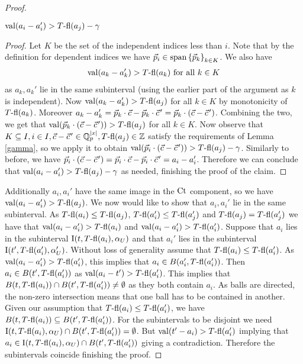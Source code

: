 \documentclass{amsart}
\begin{document}
\begin{proof}
  \begin{Claim}
    $\operatorname{val}(a_i - a_i') > T{\operatorname{-fl}}(a_j) - \gamma$
  \end{Claim}
  \begin{proof}
    Let $K$ be the set of the independent indices less than $i$.
    Note that by the definition for dependent indices we have $\vec p_i \in \operatorname{span} \left\{\vec p_k\right\}_{k \in K}$.
    We also have 
    \begin{align*}
      \operatorname{val}(a_k - a_k') > T{\operatorname{-fl}}(a_k) \text { for all } k \in K
    \end{align*}
    as $a_k, a_k'$ lie in the same subinterval (using the earlier part of the argument as $k$ is independent).
    Now $\operatorname{val}(a_k - a_k') > T{\operatorname{-fl}}(a_j)$  for all $k \in K$ by monotonicity of $T{\operatorname{-fl}}(a_k)$.
    Moreover $a_k - a_k' = \vec p_k \cdot \vec c - \vec p_k \cdot \pvec c' = \vec p_k \cdot (\vec c - \pvec {c}')$.
    Combining the two, we get that $\val(\vec p_k \cdot (\vec c - \pvec {c}')) > \tfl(a_j)$ for all $k \in K$.
    Now observe that $K \subseteq I, i \in I, \vec c - \pvec {c}' \in \Q_p^{|x|}, \tfl(a_j) \in \Z$
    satisfy the requirements of Lemma \ref {gamma}, so we apply it to obtain
    $\val(\vec p_i \cdot (\vec c - \pvec {c}')) > \tfl(a_j) - \gamma$.
    Similarly to before, we have $\vec p_i \cdot (\vec c - \pvec {c}') = \vec p_i \cdot \vec c - \vec p_i \cdot \pvec {c}' = a_i - a_i'$.
    Therefore we can conclude that $\operatorname{val}(a_i - a_i') > T{\operatorname{-fl}}(a_j) - \gamma$
    as needed, finishing the proof of the claim.
  \end{proof}	
  Additionally $a_i, a_i'$ have the same image in the $\operatorname{Ct}$ component, so we have $\operatorname{val}(a_i - a_i') > T{\operatorname{-fl}}(a_j)$.
  We now would like to show that $a_i, a_i'$ lie in the same subinterval.
  As $T{\operatorname{-fl}}(a_i) \leq T{\operatorname{-fl}}(a_j)$, $T{\operatorname{-fl}}(a_i') \leq T{\operatorname{-fl}}(a_j')$ and $T{\operatorname{-fl}}(a_j) = T{\operatorname{-fl}}(a_j')$ we have that
  $\operatorname{val}(a_i - a_i') > T{\operatorname{-fl}}(a_i)$ and $\operatorname{val}(a_i - a_i') > T{\operatorname{-fl}}(a_i')$.
  Suppose that $a_i$ lies in the subinterval $\operatorname{I}(t, T{\operatorname{-fl}}(a_i), \alpha_U)$
  and that $a_i'$ lies in the subinterval $\operatorname{I}(t', T{\operatorname{-fl}}(a_i'), \alpha_U')$.
  Without loss of generality assume that $T{\operatorname{-fl}}(a_i) \leq T{\operatorname{-fl}}(a_i')$.
  As $\operatorname{val}(a_i - a_i') > T{\operatorname{-fl}}(a_i')$, this implies that $a_i \in B(a_i', T{\operatorname{-fl}}(a_i'))$.
  Then $a_i \in B(t', T{\operatorname{-fl}}(a_i'))$ as $\operatorname{val}(a_i - t') > T{\operatorname{-fl}}(a_i')$.
  This implies that $B(t, T{\operatorname{-fl}}(a_i)) \cap B(t', T{\operatorname{-fl}}(a_i')) \neq \emptyset$ as they both contain $a_i$.
  As balls are directed, the non-zero intersection means that one ball has to be contained in another.
  Given our assumption that $T{\operatorname{-fl}}(a_i) \leq T{\operatorname{-fl}}(a_i')$, we have $B(t, T{\operatorname{-fl}}(a_i)) \subseteq B(t', T{\operatorname{-fl}}(a_i'))$.
  For the subintervals to be disjoint we need 
  $\operatorname{I}(t, T{\operatorname{-fl}}(a_i), \alpha_U) \cap B(t', T{\operatorname{-fl}}(a_i')) = \emptyset$.
  But $\operatorname{val}(t' - a_i) > T{\operatorname{-fl}}(a_i')$ implying that $a_i \in \operatorname{I}(t, T{\operatorname{-fl}}(a_i), \alpha_U) \cap B(t', T{\operatorname{-fl}}(a_i'))$ giving a contradiction.
  Therefore the subintervals coincide finishing the proof.
\end{proof}
\end{document}
